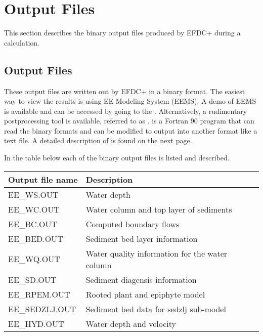 \documentclass[letterpaper,10pt,english]{sphinxmanual}
\begin{document}
\section{Output Files}
\label{\detokenize{outputfiles/index:output-files}}\label{\detokenize{outputfiles/index:index}}\label{\detokenize{outputfiles/index::doc}}
This section describes the binary output files produced by EFDC+ during a calculation.


\subsection{Output Files}
\label{\detokenize{outputfiles/output:output-files}}\label{\detokenize{outputfiles/output:output}}\label{\detokenize{outputfiles/output::doc}}
These output files are written out by EFDC+ in a binary format. The easiest way to view the results is using EE Modeling System (EEMS).  A demo of EEMS is available and can be accessed by going to the .  Alternatively, a rudimentary postprocessing tool is available, referred to as .   is a Fortran 90 program that can read the binary formats and can be modified to output into another format like a text file.  A detailed description of  is found on the next page.

In the table below each of the binary output files is listed and described.


\begin{savenotes}\sphinxattablestart
\centering
\begin{tabulary}{\linewidth}[t]{|T|T|}
\hline
\sphinxstyletheadfamily 
Output file name
&\sphinxstyletheadfamily 
Description
\\
\hline
EE\_WS.OUT
&
Water depth
\\
\hline
EE\_WC.OUT
&
Water column and top layer of sediments
\\
\hline
EE\_BC.OUT
&
Computed boundary flows
\\
\hline
EE\_BED.OUT
&
Sediment bed layer information
\\
\hline
EE\_WQ.OUT
&
Water quality information for the water column
\\
\hline
EE\_SD.OUT
&
Sediment diagensis information
\\
\hline
EE\_RPEM.OUT
&
Rooted plant and epiphyte model
\\
\hline
EE\_SEDZLJ.OUT
&
Sediment bed data for sedzlj sub-model
\\
\hline
EE\_HYD.OUT
&
Water depth and velocity
\\
\hline
\end{tabulary}
\par
\sphinxattableend\end{savenotes}
\end{document}
